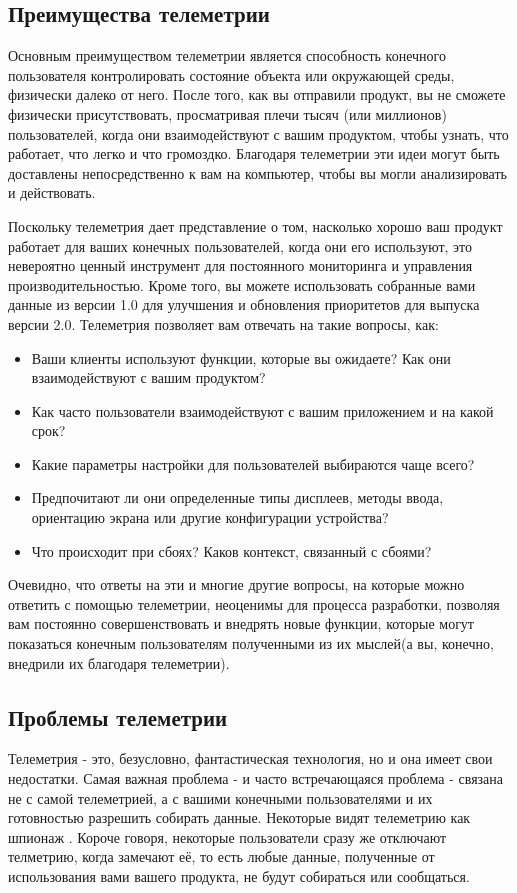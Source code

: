 \subsection{Преимущества телеметрии}
Основным преимуществом телеметрии является способность конечного пользователя контролировать состояние объекта или окружающей среды, физически далеко от него. После того, как вы отправили продукт, вы не сможете физически присутствовать, просматривая плечи тысяч (или миллионов) пользователей, когда они взаимодействуют с вашим продуктом, чтобы узнать, что работает, что легко и что громоздко. Благодаря телеметрии эти идеи могут быть доставлены непосредственно к вам на компьютер, чтобы вы могли анализировать и действовать.

Поскольку телеметрия дает представление о том, насколько хорошо ваш продукт работает для ваших конечных пользователей, когда  они его используют, это невероятно ценный инструмент для постоянного мониторинга и управления производительностью. Кроме того, вы можете использовать собранные вами данные из версии 1.0 для улучшения и обновления приоритетов для выпуска версии 2.0.
Телеметрия позволяет вам отвечать на такие вопросы, как:
\begin{itemize}
	\item 	Ваши клиенты используют функции, которые вы ожидаете? Как они взаимодействуют с вашим продуктом?
	\item Как часто пользователи взаимодействуют с вашим приложением и на какой срок?
     \item Какие параметры настройки для пользователей выбираются чаще всего?
     \item Предпочитают ли они определенные типы дисплеев, методы ввода, ориентацию экрана или другие конфигурации устройства?
     \item  Что происходит при сбоях? Каков контекст, связанный с сбоями?
\end{itemize}
Очевидно, что ответы на эти и многие другие вопросы, на которые можно ответить с помощью телеметрии, неоценимы для процесса разработки, позволяя вам постоянно совершенствовать и внедрять новые функции, которые могут показаться конечным пользователям полученными из их мыслей(а вы, конечно, внедрили их благодаря телеметрии).
\subsection{Проблемы телеметрии}
Телеметрия - это, безусловно, фантастическая технология, но и она имеет свои недостатки. Самая важная проблема - и часто встречающаяся проблема - связана не с самой телеметрией, а с вашими конечными пользователями и их готовностью разрешить собирать данные. Некоторые видят телеметрию как  шпионаж . Короче говоря, некоторые пользователи сразу же отключают телметрию, когда замечают её, то есть любые данные, полученные от использования вами вашего продукта, не будут собираться или сообщаться.

